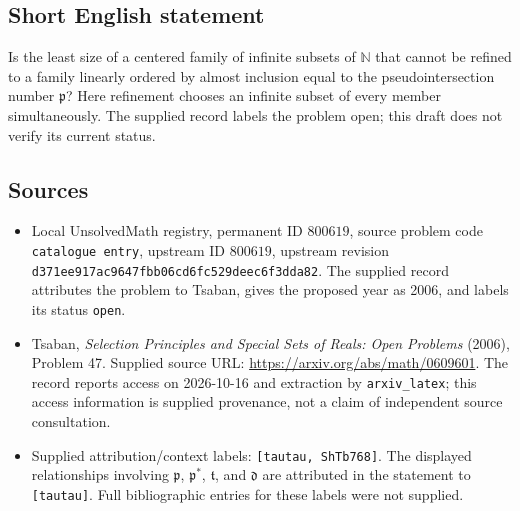 \documentclass[11pt]{article}
\newcommand{\N}{\mathbb{N}}
\begin{document}
\subsection{Short English statement}
Is the least size of a centered family of infinite subsets of \(\N\) that cannot be refined to a family linearly ordered by almost inclusion equal to the pseudointersection number \(\mathfrak p\)? Here refinement chooses an infinite subset of every member simultaneously. The supplied record labels the problem open; this draft does not verify its current status.
\subsection{Sources}
\begin{itemize}
\item Local UnsolvedMath registry, permanent ID \(800619\), source problem code \texttt{catalogue entry}, upstream ID \(800619\), upstream revision \texttt{d371ee917ac9647fbb06cd6fc529deec6f3dda82}. The supplied record attributes the problem to Tsaban, gives the proposed year as 2006, and labels its status \texttt{open}.
\item Tsaban, \emph{Selection Principles and Special Sets of Reals: Open Problems} (2006), Problem 47. Supplied source URL: \url{https://arxiv.org/abs/math/0609601}. The record reports access on 2026-10-16 and extraction by \texttt{arxiv\_latex}; this access information is supplied provenance, not a claim of independent source consultation.
\item Supplied attribution/context labels: \texttt{[tautau, ShTb768]}. The displayed relationships involving \(\mathfrak p\), \(\mathfrak p^*\), \(\mathfrak t\), and \(\mathfrak d\) are attributed in the statement to \texttt{[tautau]}. Full bibliographic entries for these labels were not supplied.
\end{itemize}
\end{document}
